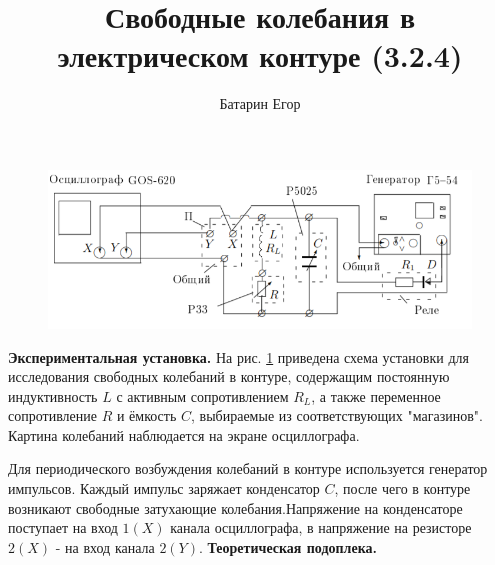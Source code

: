 \documentclass[a4paper,12pt]{article}
\author{Батарин Егор}
\title{Свободные колебания в электрическом контуре (3.2.4)}
\begin{document}
\maketitle
\setlength{\extrarowheight}{1mm}

\begin{figure}[h]
	\includegraphics{Рис1.png}
	\caption{}
	\label{fig1}
\end{figure}


{\bfseries Экспериментальная установка.} На рис. \ref{fig1} приведена схема установки для исследования свободных
колебаний в контуре, содержащим постоянную индуктивность $L$ с активным сопротивлением $R_L$, а также переменное 
сопротивление $R$ и ёмкость $C$, выбираемые из соответствующих "магазинов". Картина колебаний наблюдается на экране осциллографа.

Для периодического возбуждения колебаний в контуре используется генератор импульсов. Каждый импульс заряжает конденсатор $C$, 
после чего в контуре возникают свободные затухающие колебания.Напряжение на конденсаторе поступает на вход $1(X)$ канала осциллографа, в напряжение на резисторе $2(X)$ - на вход канала $2(Y)$.
\newpage
{\bfseries Теоретическая подоплека.} 
\end{document}
